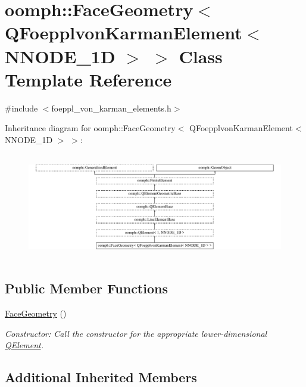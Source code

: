 \hypertarget{classoomph_1_1FaceGeometry_3_01QFoepplvonKarmanElement_3_01NNODE__1D_01_4_01_4}{}\section{oomph\+:\+:Face\+Geometry$<$ Q\+Foepplvon\+Karman\+Element$<$ N\+N\+O\+D\+E\+\_\+1D $>$ $>$ Class Template Reference}
\label{classoomph_1_1FaceGeometry_3_01QFoepplvonKarmanElement_3_01NNODE__1D_01_4_01_4}


{\ttfamily \#include $<$foeppl\+\_\+von\+\_\+karman\+\_\+elements.\+h$>$}

Inheritance diagram for oomph\+:\+:Face\+Geometry$<$ Q\+Foepplvon\+Karman\+Element$<$ N\+N\+O\+D\+E\+\_\+1D $>$ $>$\+:\begin{figure}[H]
\begin{center}
\leavevmode
\includegraphics[height=4.677804cm]{classoomph_1_1FaceGeometry_3_01QFoepplvonKarmanElement_3_01NNODE__1D_01_4_01_4}
\end{center}
\end{figure}
\subsection*{Public Member Functions}
\begin{DoxyCompactItemize}
\item 
\hyperlink{classoomph_1_1FaceGeometry_3_01QFoepplvonKarmanElement_3_01NNODE__1D_01_4_01_4_a8a335d862dfc293ada89c1aa2b52efa0}{Face\+Geometry} ()
\begin{DoxyCompactList}\small\item\em Constructor\+: Call the constructor for the appropriate lower-\/dimensional \hyperlink{classoomph_1_1QElement}{Q\+Element}. \end{DoxyCompactList}\end{DoxyCompactItemize}
\subsection*{Additional Inherited Members}


